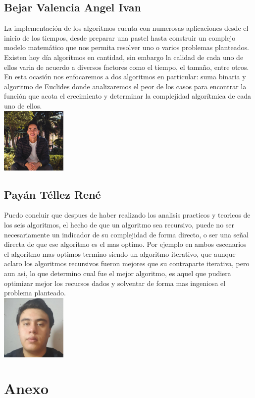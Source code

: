 \documentclass[spanish]{article}
\begin{document}
			\subsection{Bejar Valencia Angel Ivan}
			La implementación de los algoritmos cuenta con numerosas aplicaciones desde el inicio de los tiempos, desde preparar una pastel hasta construir un complejo modelo matemático que nos permita resolver uno o varios problemas planteados. Existen hoy día algoritmos en cantidad, sin embargo la calidad de cada uno de ellos varia de acuerdo a diversos factores como el tiempo, el tamaño, entre otros. En esta ocasión nos enfocaremos a dos algoritmos en particular: suma binaria y algoritmo de Euclides donde analizaremos el peor de los casos para encontrar la función que acota el crecimiento y determinar la complejidad algorítmica de cada uno de ellos.\\
			\includegraphics[height=120px,width=120px]{ivan}
			\subsection{Payán Téllez René}
			Puedo concluir que despues de haber realizado los analisis practicos y teoricos de los seis algoritmos, el hecho de que un algoritmo sea recursivo, puede no ser necesariamente un indicador de su complejidad de forma directo, o ser una señal directa de que ese algoritmo es el mas optimo. Por ejemplo en ambos escenarios el algoritmo mas optimos termino siendo un algoritmo iterativo, que aunque aclaro los algoritmos recursivos fueron mejores que su contraparte iterativa, pero aun asi, lo que determino cual fue el mejor algoritmo, es aquel que pudiera optimizar mejor los recursos dados y solventar de forma mas ingeniosa el problema planteado.\\
			\includegraphics[height=120px,width=120px]{Rene}
		\section{Anexo}
\end{document}
